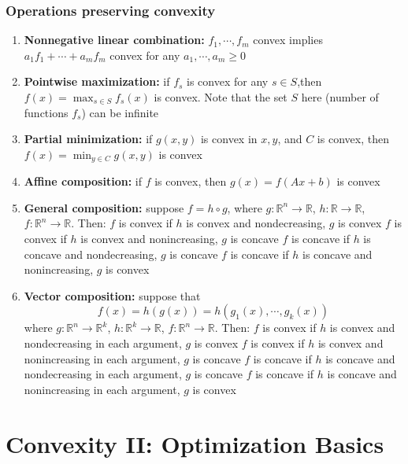 \documentclass[a4paper]{article}
\begin{document}
{\subsubsection{Operations preserving convexity}
\begin{enumerate}
  \item \textbf{Nonnegative linear combination:} $f_1,\cdots,f_m$ convex implies $a_1f_1 + \cdots + a_mf_m$ convex for any $a_1,\cdots,a_m \geq 0$
  \item \textbf{Pointwise maximization:} if $f_s$ is convex for any $s \in S$,then $f(x) = \max_{s \in S} f_s(x)$ is convex. Note that the set $S$ here (number of functions $f_s$) can be infinite
  \item \textbf{Partial minimization:} if $g(x,y)$ is convex in $x, y$, and $C$ is convex, then $f(x) = \min_{y \in C}g(x,y)$ is convex
  \item \textbf{Affine composition:} if $f$ is convex, then $g(x)=f(Ax+b)$ is convex
  \item \textbf{General composition:} suppose $f = h\circ g$, where $g : \mathbb{R}^n \rightarrow \mathbb{R}$, $h : \mathbb{R} \rightarrow \mathbb{R}$, $f : \mathbb{R}^n \rightarrow \mathbb{R}$. Then:
  \subitem $f$ is convex if $h$ is convex and nondecreasing, $g$ is convex
  \subitem $f$ is convex if $h$ is convex and nonincreasing, $g$ is concave
  \subitem $f$ is concave if $h$ is concave and nondecreasing, $g$ is concave
  \subitem $f$ is concave if $h$ is concave and nonincreasing, $g$ is convex
  \item \textbf{Vector composition:} suppose that
  \[
    f(x) = h(g(x)) = h(g_1(x), \cdots, g_k(x))
  \]
  where $g : \mathbb{R}^n \rightarrow \mathbb{R}^k$, $h : \mathbb{R}^k \rightarrow \mathbb{R}$, $f : \mathbb{R}^n \rightarrow \mathbb{R}$. Then:
  \subitem $f$ is convex if $h$ is convex and nondecreasing in each argument, $g$ is convex
  \subitem $f$ is convex if $h$ is convex and nonincreasing in each argument, $g$ is concave
  \subitem $f$ is concave if $h$ is concave and nondecreasing in each argument, $g$ is concave
  \subitem $f$ is concave if $h$ is concave and nonincreasing in each argument, $g$ is convex
\end{enumerate}

\section{Convexity II: Optimization Basics}
}
\end{document}
